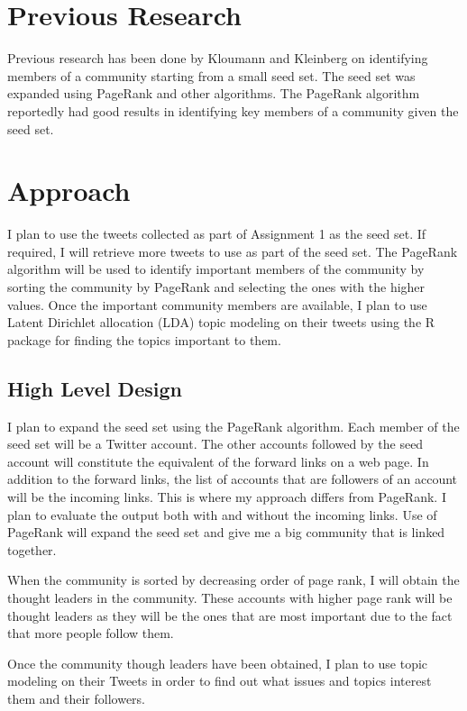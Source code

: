 \documentclass{sig-alternate-05-2015}
\begin{document}
\section{Previous Research}

Previous research has been done by Kloumann and Kleinberg \cite{SeedSet} on identifying members of a community starting from a small seed set. The seed set was expanded using PageRank and other algorithms. The PageRank algorithm reportedly had good results in identifying key members of a community given the seed set.
\section{Approach}
I plan to use the tweets collected as part of Assignment 1 as the seed set. If required, I will retrieve more tweets to use as part of the seed set. The PageRank algorithm will be used to identify important members of the community by sorting the community by PageRank and selecting the ones with the higher values. Once the important community members are available, I plan to use Latent Dirichlet allocation (LDA) topic modeling on their tweets using the R package for finding the topics important to them.

\subsection{High Level Design}
I plan to expand the seed set using the PageRank algorithm. Each member of the seed set will be a Twitter account. The other accounts followed by the seed account will constitute the equivalent of the forward links on a web page. In addition to the forward links, the list of accounts that are followers of an account will be the incoming links. This is where my approach differs from PageRank. I plan to evaluate the output both with and without the incoming links. Use of PageRank will expand the seed set and give me a big community that is linked together. 

When the community is sorted by decreasing order of page rank, I will obtain the thought leaders in the community. These accounts with higher page rank will be thought leaders as they will be the ones that are most important due to the fact that more people follow them.

Once the community though leaders have been obtained, I plan to use topic modeling on their Tweets in order to find out what issues and topics interest them and their followers.
\end{document}
